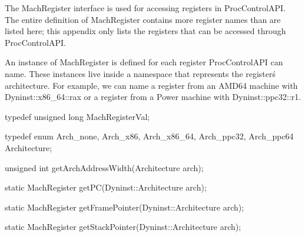 
The MachRegister interface is used for accessing registers in
ProcControlAPI. The entire definition of MachRegister contains more register
names than are listed here; this appendix only lists the registers that can be
accessed through ProcControlAPI.

An instance of MachRegister is defined for each register ProcControlAPI can
name. These instances live inside a namespace that represents the
register\'s architecture. For example, we can name a
register from an AMD64 machine with Dyninst::x86\_64::rax or a register from a
Power machine with Dyninst::ppc32::r1.


\begin{apient}
typedef unsigned long MachRegisterVal;
\end{apient}


\begin{apient}
typedef enum { Arch_none, Arch_x86, Arch_x86_64, Arch_ppc32, Arch_ppc64 } Architecture;
\end{apient}


\begin{apient}
unsigned int getArchAddressWidth(Architecture arch);
\end{apient}


\begin{apient}
static MachRegister getPC(Dyninst::Architecture arch);
\end{apient}


\begin{apient}
static MachRegister getFramePointer(Dyninst::Architecture arch);
\end{apient}


\begin{apient}
static MachRegister getStackPointer(Dyninst::Architecture arch);
\end{apient}


